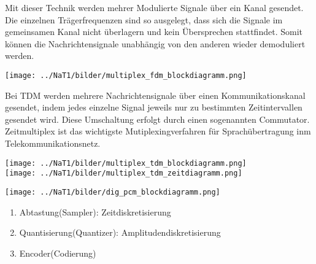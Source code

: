 Mit dieser Technik werden mehrer Modulierte Signale über ein Kanal gesendet. Die einzelnen
Trägerfrequenzen sind so ausgelegt, dass sich die Signale im gemeinsamen Kanal nicht überlagern und
kein Übersprechen stattfindet. Somit können die Nachrichtensignale unabhängig von den anderen
wieder demoduliert werden.
\begin{center}
    \texttt{[image: ../NaT1/bilder/multiplex\_fdm\_blockdiagramm.png]}
\end{center}

Bei TDM werden mehrere Nachrichtensignale über einen Kommunikationskanal gesendet, indem jedes
einzelne Signal jeweils nur zu bestimmten Zeitintervallen gesendet wird. Diese Umschaltung erfolgt
durch einen sogenannten Commutator. \\
Zeitmultiplex ist das wichtigste Mutiplexingverfahren für
Sprachübertragung inm Telekommunikationsnetz.
\begin{center}
    \texttt{[image: ../NaT1/bilder/multiplex\_tdm\_blockdiagramm.png]} \\
    \texttt{[image: ../NaT1/bilder/multiplex\_tdm\_zeitdiagramm.png]}     
\end{center}











\newpage
{}

\begin{center}
	\texttt{[image: ../NaT1/bilder/dig\_pcm\_blockdiagramm.png]}
\end{center}
\begin{enumerate}
  \item Abtastung(Sampler): Zeitdiskretisierung 
  \item Quantisierung(Quantizer): Amplitudendiskretisierung
  \item Encoder(Codierung)
\end{enumerate}

